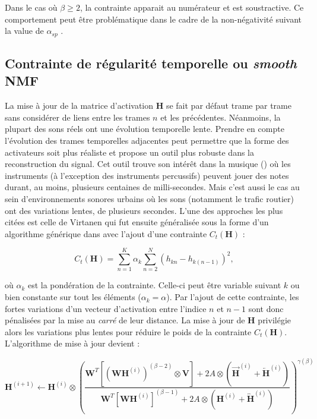 Dans le cas où $\beta \geq 2$, la contrainte apparait au numérateur et est soustractive. Ce comportement peut être problématique dans le cadre de la non-négativité suivant la value de $\alpha_{sp}$ \cite{fevotte_algorithms_2011}.

\subsection{Contrainte de régularité temporelle ou \textit{smooth} NMF}\label{part:smoothness}

La mise à jour de la matrice d'activation $\mathbf{H}$ se fait par défaut trame par trame sans considérer de liens entre les trames $n$ et les précédentes. Néanmoins, la plupart des sons réels ont une évolution temporelle lente. Prendre en compte l'évolution des trames temporelles adjacentes peut permettre que la forme des activateurs soit plus réaliste et propose un outil plus robuste dans la reconstruction du signal. Cet outil trouve son intérêt dans la musique (\cite{virtanen_sound_2003, fevotte_majorization-minimization_2011}) où les instruments (à l'exception des instruments percussifs) peuvent jouer des notes durant, au moins, plusieurs centaines de milli-secondes. Mais c'est aussi le cas au sein d'environnements sonores urbains où les sons (notamment le trafic routier) ont des variations lentes, de plusieurs secondes. L'une des approches les plus citées est celle de Virtanen \cite{virtanen_monaural_2007} qui fut ensuite généralisée sous la forme d'un algorithme générique dans \cite{fevotte2017single} avec l'ajout d'une contrainte $C_t(\mathbf{H})$ :

\begin{equation}\label{eq:smoothnessVirtanen}
C_t(\mathbf{H}) = \sum_{n=1}^K \alpha_k\sum_{n=2}^N \left(h_{kn} - h_{k(n-1)}\right)^2,
\end{equation}

où $\alpha_k$ est la pondération de la contrainte. Celle-ci peut être variable suivant $k$ ou bien constante sur tout les éléments ($\alpha_k = \alpha$). Par l'ajout de cette contrainte, les fortes variations d'un vecteur d'activation entre l'indice $n$ et $n-1$ sont donc pénalisées par la mise au \textit{carré} de leur distance. La mise à jour de $\mathbf{H}$ privilégie alors les variations plus lentes pour réduire le poids de la contrainte $C_t(\mathbf{H})$. L'algorithme de mise à jour devient :

\begin{equation}
\textbf{H}^{(i+1)} \leftarrow \textbf{H}^{(i)} \otimes\left(\frac{\textbf{W}^T \left[\left(\textbf{WH}^{(i)} \right)^{(\beta-2)} \otimes \textbf{V} \right] + 2 A \otimes \left(\overrightarrow{\mathbf{H}}^{(i)} + \overleftarrow{\mathbf{H}}^{(i)} \right)}{\textbf{W}^T \left[\textbf{WH}^{(i)} \right]^{(\beta-1)} + 2 A \otimes \left(\mathbf{H}^{(i)} + \overleftrightarrow{\mathbf{H}}^{(i)} \right)}\right)^{\gamma(\beta)}\label{eq:HupdateSmooth}
\end{equation}

